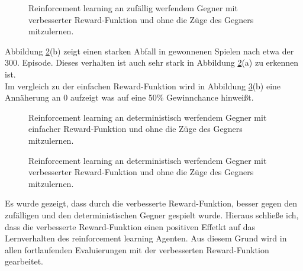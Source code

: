 \begin{figure}%
    \centering
    \qquad
    \caption{Reinforcement learning an zufällig werfendem Gegner mit verbesserter Reward-Funktion und ohne die Züge des Gegners mitzulernen.}%
    \label{fig:randomTF}%
\end{figure}

Abbildung \ref{fig:leftiFF}(b) zeigt einen starken Abfall in gewonnenen Spielen nach etwa der 300. Episode. Dieses verhalten ist auch sehr stark in Abbildung \ref{fig:leftiFF}(a) zu erkennen ist.\\
Im vergleich zu der einfachen Reward-Funktion wird in Abbildung \ref{fig:leftiTF}(b) eine Annäherung an 0 aufzeigt was auf eine 50\% Gewinnchance hinweißt.

\begin{figure}%
    \centering
    \qquad
    \caption{Reinforcement learning an deterministisch werfendem Gegner mit einfacher Reward-Funktion und ohne die Züge des Gegners mitzulernen.}%
    \label{fig:leftiFF}%
\end{figure}

\begin{figure}%
    \centering
    \qquad
    \caption{Reinforcement learning an deterministisch werfendem Gegner mit verbesserter Reward-Funktion und ohne die Züge des Gegners mitzulernen.}%
    \label{fig:leftiTF}%
\end{figure}
Es wurde gezeigt, dass durch die verbesserte Reward-Funktion, besser gegen den zufälligen und den deterministischen Gegner gespielt wurde.
Hieraus schließe ich, dass die verbesserte Reward-Funktion einen positiven Effetkt auf das Lernverhalten des reinforcement learning Agenten.
Aus diesem Grund wird in allen fortlaufenden Evaluierungen mit der verbesserten Reward-Funktion gearbeitet.

